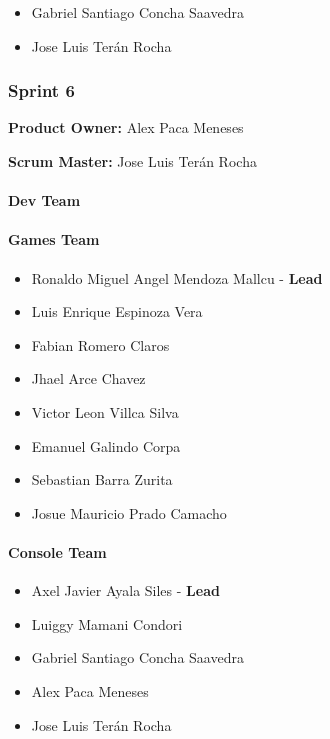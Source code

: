 \begin{itemize}
\tightlist
\item
  Gabriel Santiago Concha Saavedra
\item
  Jose Luis Terán Rocha
\end{itemize}

\hypertarget{sprint6}{
\subsubsection{\texorpdfstring{\textbf{Sprint
6}}{Sprint 6}}\label{sprint6}}

\textbf{Product Owner: }
Alex Paca Meneses

\textbf{Scrum Master: }
Jose Luis Terán Rocha

\hypertarget{devteam-6}{
\paragraph{\texorpdfstring{\textbf{Dev
Team}}{Dev Team}}\label{devteam-6}}

\paragraph{Games Team}\label{games-team-6}

\begin{itemize}
\tightlist
\item
  Ronaldo Miguel Angel Mendoza Mallcu - \textbf{Lead}
\item
  Luis Enrique Espinoza Vera
\item
  Fabian Romero Claros 
\item
  Jhael Arce Chavez
\item
  Victor Leon Villca Silva
\item
  Emanuel Galindo Corpa
\item
  Sebastian Barra Zurita
\item
  Josue Mauricio Prado Camacho
\end{itemize}

\paragraph{Console Team}\label{console-team-6}

\begin{itemize}
\tightlist
\item
  Axel Javier Ayala Siles - \textbf{Lead}
\item
  Luiggy Mamani Condori
\item
  Gabriel Santiago Concha Saavedra
\item
  Alex Paca Meneses
\item
  Jose Luis Terán Rocha
\end{itemize}


